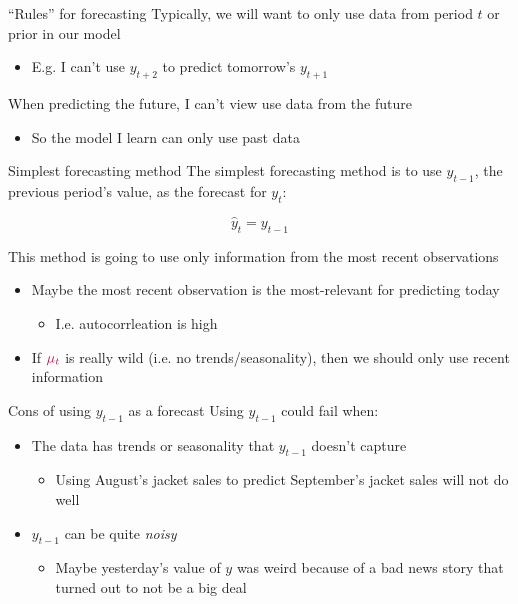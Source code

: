 \documentclass[aspectratio=169,t,11pt,table]{beamer}
\begin{document}
\begin{frame}{``Rules'' for forecasting}
  Typically, we will want to only use data from period $t$ or prior in our model 
  \begin{itemize}
    \item E.g. I can't use $y_{t+2}$ to predict tomorrow's $y_{t+1}$ 
  \end{itemize}

  \bigskip
  When predicting the future, I can't view use data from the future
  \begin{itemize}
    \item So the model I learn can only use past data
  \end{itemize}
\end{frame}

\begin{frame}{Simplest forecasting method}
  The \alert{simplest} forecasting method is to use $y_{t-1}$, the previous period's value, as the forecast for $y_t$:

  $$
    \hat{y}_t = y_{t-1}
  $$
  
  This method is going to use only information from the most recent observations
  \begin{itemize}
    \item Maybe the most recent observation is the most-relevant for predicting today
    \begin{itemize}
      \item I.e. autocorrleation is high
    \end{itemize}
    
    \item If ${\color[HTML]{B3114B} \mu_t}$ is really wild (i.e. no trends/seasonality), then we should only use recent information
  \end{itemize}
\end{frame}

\begin{frame}{Cons of using $y_{t-1}$ as a forecast}
  Using $y_{t-1}$ could fail when:
  \begin{itemize}
    \item The data has \alert{trends} or \alert{seasonality} that $y_{t-1}$ doesn't capture
    \begin{itemize}
      \item Using August's jacket sales to predict September's jacket sales will not do well
    \end{itemize}

    \pause
    \item $y_{t-1}$ can be quite \emph{noisy} 
    \begin{itemize}
      \item Maybe yesterday's value of $y$ was weird because of a bad news story that turned out to not be a big deal
    \end{itemize}
  \end{itemize}
\end{frame}
\end{document}
